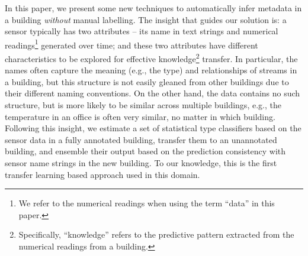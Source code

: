 In this paper, we present some new techniques to automatically infer metadata in a building {\it without} manual labelling.
The insight that guides our solution is: a sensor typically has two attributes -- its name in text strings and numerical readings\footnote{We refer to the numerical readings when using the term ``data'' in this paper.} generated over time; and these two attributes have different characteristics to be explored for effective knowledge\footnote{Specifically, ``knowledge'' refers to the predictive pattern extracted from the numerical readings from a building.} transfer.
In particular, the names often capture the meaning (e.g., the type) and relationships of streams in a building, but this structure is not easily gleaned from other buildings due to their different naming conventions.
On the other hand, the data contains no such structure, but is more likely to be similar across multiple buildings, e.g., the temperature in an office is often very similar, no matter in which building.
Following this insight, we estimate a set of statistical type classifiers based on the sensor data in a fully annotated building, transfer them to an unannotated building, and ensemble their output based on the prediction consistency with sensor name strings in the new building.
To our knowledge, this is the first transfer learning based approach used in this domain.

